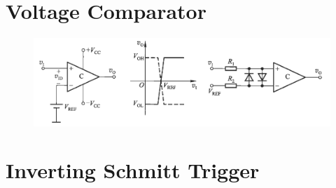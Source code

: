 \section{Voltage Comparator}

\begin{figure}[H]
  \centering
  \includegraphics[width=\linewidth]{figures/Voltage-Comparator}
\end{figure}

\section{Inverting Schmitt Trigger}

